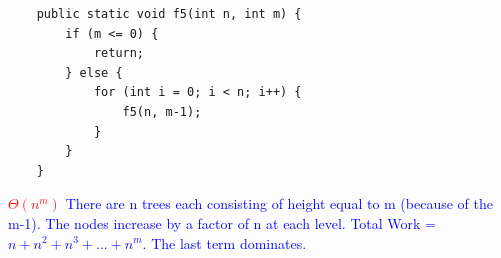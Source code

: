 \documentclass[11pt,letterpaper]{article}
\begin{document}
\begin{lstlisting}
    public static void f5(int n, int m) {
        if (m <= 0) {
            return;
        } else {
            for (int i = 0; i < n; i++) {
                f5(n, m-1);
            }
        }
    }
\end{lstlisting}
\textcolor{red}{$\Theta(n^m)$}
\newline
\newline
\textcolor{blue}{There are n trees each consisting of height equal to m (because of the m-1). The nodes increase by a factor of n at each level. 
\newline
\newline
Total Work = $n + n^2 + n^3 + ... + n^m$. The last term dominates. }
\end{document}
